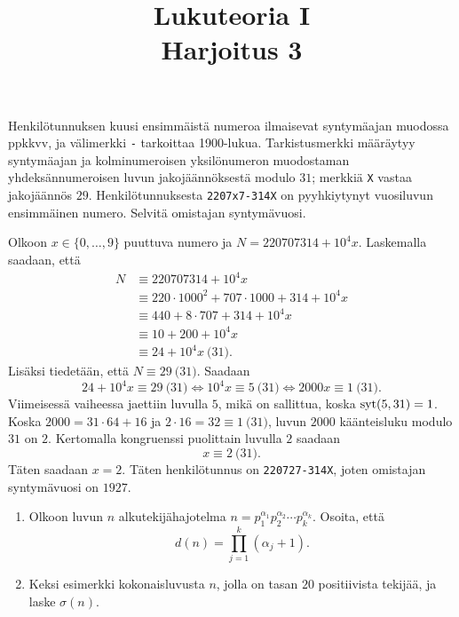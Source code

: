 \documentclass[11pt,a4paper]{amsart}
\title{Lukuteoria I\\Harjoitus 3}
\author{}
\date{}
\begin{document}

\begin{exercise}
  Henkilötunnuksen kuusi ensimmäistä numeroa ilmaisevat syntymäajan muodossa
  ppkkvv, ja välimerkki \texttt{-} tarkoittaa 1900-lukua. Tarkistusmerkki
  määräytyy syntymäajan ja kolminumeroisen yksilönumeron muodostaman
  yhdeksännumeroisen luvun jakojäännöksestä modulo \(31\); merkkiä
  \texttt{X} vastaa jakojäännös \(29\).
  Henkilötunnuksesta \texttt{2207x7-314X} on pyyhkiytynyt vuosiluvun
  ensimmäinen numero. Selvitä omistajan syntymävuosi.
\end{exercise}

\begin{solution}
  Olkoon \(x \in \{0,\ldots,9\}\) puuttuva numero ja
  \(N = 220707314 + 10^4x\). Laskemalla saadaan, että
  \[
    \begin{aligned}
      N &\equiv 220707314 + 10^4x \\
      &\equiv 220\cdot 1000^2 + 707\cdot 1000 + 314 + 10^4x \\
      &\equiv 440 + 8\cdot 707 + 314 + 10^4x \\
      &\equiv 10 + 200 + 10^4x \\
      &\equiv 24 + 10^4x \pod{31}.
    \end{aligned}
  \]
  Lisäksi tiedetään, että \(N \equiv 29 \pod{31}\). Saadaan
  \[
    24 + 10^4x \equiv 29 \pod{31} \iff 10^4x \equiv 5 \pod{31} \iff
    2000x \equiv 1 \pod{31}.
  \]
  Viimeisessä vaiheessa jaettiin luvulla \(5\), mikä on sallittua, koska
  \(\operatorname{syt}(5,31)=1\). Koska \(2000 = 31\cdot 64 + 16\) ja
  \(2\cdot 16 = 32 \equiv 1 \pod{31}\), luvun \(2000\) käänteisluku
  modulo \(31\) on \(2\). Kertomalla kongruenssi puolittain luvulla
  \(2\) saadaan
  \[
    x \equiv 2 \pod{31}.
  \]
  Täten saadaan \(x=2\). Täten henkilötunnus on
  \texttt{220727-314X}, joten omistajan syntymävuosi on \(1927\).
\end{solution}

\begin{exercise}
  \leavevmode\par
  \begin{enumerate}[label=(\alph*), nosep]
    \item Olkoon luvun \(n\) alkutekijähajotelma
      \(n = p_1^{\alpha_1}p_2^{\alpha_2}\cdots p_k^{\alpha_k}\).
      Osoita, että
      \[
        d(n) = \prod_{j=1}^{k}(\alpha_j + 1).
      \]
    \item Keksi esimerkki kokonaisluvusta \(n\), jolla on tasan \(20\)
      positiivista tekijää, ja laske \(\sigma(n)\).
  \end{enumerate}
\end{exercise}
\end{document}
